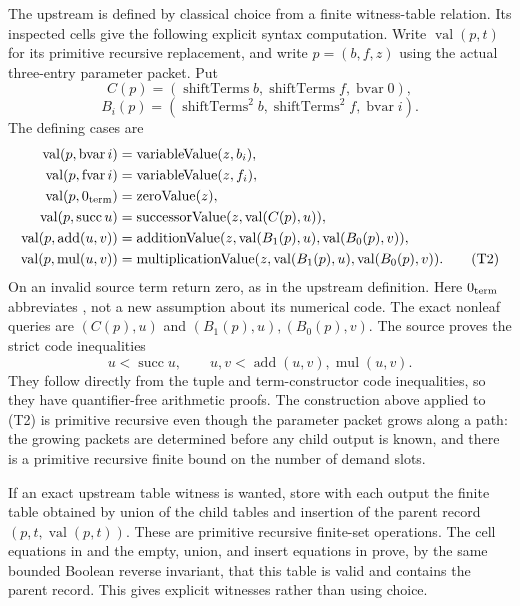 The upstream  is defined by
classical choice from a finite witness-table relation.  Its inspected
cells give the following explicit syntax computation.  Write
$\operatorname{val}(p,t)$ for its primitive recursive replacement, and write
$p=(b,f,z)$ using the actual three-entry parameter packet.  Put
\[
 C(p)=(\operatorname{shiftTerms}b,
       \operatorname{shiftTerms}f,\operatorname{bvar}0),
\]
\[
 B_i(p)=(\operatorname{shiftTerms}^2b,
         \operatorname{shiftTerms}^2f,\operatorname{bvar}i).
\]
The defining cases are
\begin{align*}
 \operatorname{val}(p,\operatorname{bvar}i)&=\operatorname{variableValue}(z,b_i),\\
 \operatorname{val}(p,\operatorname{fvar}i)&=\operatorname{variableValue}(z,f_i),\\
 \operatorname{val}(p,0_{\rm term})&=\operatorname{zeroValue}(z),\\
 \operatorname{val}(p,\operatorname{succ}u)&=
   \operatorname{successorValue}(z,\operatorname{val}(C(p),u)),\\
 \operatorname{val}(p,\operatorname{add}(u,v))&=
   \operatorname{additionValue}(z,\operatorname{val}(B_1(p),u),\operatorname{val}(B_0(p),v)),\\
 \operatorname{val}(p,\operatorname{mul}(u,v))&=
   \operatorname{multiplicationValue}(z,\operatorname{val}(B_1(p),u),\operatorname{val}(B_0(p),v)).
 \tag{T2}
\end{align*}
On an invalid source term return zero, as in the upstream definition.
Here $0_{\rm term}$ abbreviates , not a new
assumption about its numerical code.  The exact nonleaf queries are
$(C(p),u)$ and $(B_1(p),u),(B_0(p),v)$.  The source proves the strict
code inequalities
\[
 u<\operatorname{succ}u,\qquad
 u,v<\operatorname{add}(u,v),\operatorname{mul}(u,v).
\]
They follow directly from the tuple and term-constructor code
inequalities, so they have quantifier-free arithmetic proofs.
The construction above applied to (T2) is primitive recursive even
though the parameter packet grows along a path: the growing packets
are determined before any child output is known, and there is a
primitive recursive finite bound on the number of demand slots.

If an exact upstream table witness is wanted, store with each output
the finite table obtained by union of the child tables and insertion of
the parent record $(p,t,\operatorname{val}(p,t))$.  These are primitive recursive
finite-set operations.  The cell equations in
 and the empty, union, and insert
equations in  prove, by the same
bounded Boolean reverse invariant, that this table is valid and
contains the parent record.  This gives explicit witnesses rather than
using choice.


